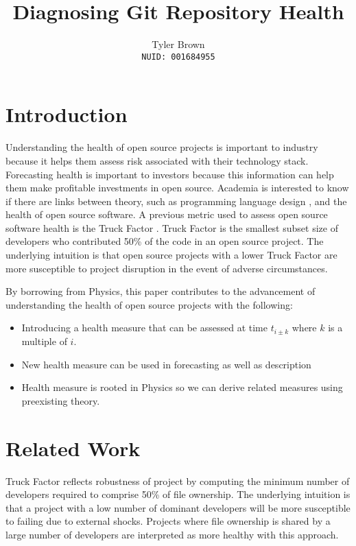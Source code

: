 \documentclass{article}
\title{Diagnosing Git Repository Health}
\author{%
  Tyler Brown\\
  \texttt{NUID: 001684955} \\
}
\begin{document}

\maketitle

\section{Introduction}

Understanding the health of open source projects is important to
industry because it helps them assess risk associated with their
technology stack. Forecasting health is important to investors because
this information can help them make profitable investments in open
source. Academia is interested to know if there are links between
theory, such as programming language design \cite{ray2014large}, and the
health of open source software. A previous metric used to assess open source
software health is the Truck Factor \cite{avelino2015truck}. Truck Factor
is the smallest subset size of developers who contributed 50\% of the code
in an open source project. The underlying intuition is that open source
projects with a lower Truck Factor are more susceptible to project disruption
in the event of adverse circumstances.

By borrowing from Physics, this paper contributes to the advancement of
understanding the health of open source projects with the following:

\begin{itemize}
\item Introducing a health measure that can be assessed at time
  $t_{i \pm k}$ where $k$ is a multiple of $i$.
\item New health measure can be used in forecasting as well as description
\item Health measure is rooted in Physics so we can derive related measures
  using preexisting theory.
\end{itemize}

\section{Related Work}

Truck Factor reflects robustness of project \cite{avelino2015truck} by
computing the minimum number of developers required to comprise 50\% of
file ownership. The underlying intuition is that a project with a low
number of dominant developers will be more susceptible to failing due
to external shocks. Projects where file ownership is shared by a large
number of developers are interpreted as more healthy with this approach.
\end{document}
